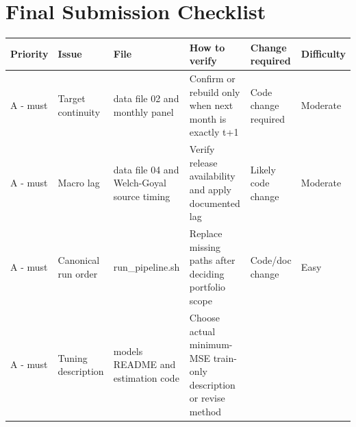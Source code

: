 \documentclass[
  11pt,
  a4paper]{article}
\newcounter{none} %
\begin{document}
\section{Final Submission Checklist}\label{app-checklist}

{\def\LTcaptype{none} %
\begin{landscape}
\scriptsize
\begin{longtable}[]{@{}
  >{\raggedright\arraybackslash}p{}
  >{\raggedright\arraybackslash}p{}
  >{\raggedright\arraybackslash}p{}
  >{\raggedright\arraybackslash}p{}
  >{\raggedright\arraybackslash}p{}
  >{\raggedright\arraybackslash}p{}@{}}
\toprule\noalign{}
\begin{minipage}[b]{\linewidth}\raggedright
Priority
\end{minipage} & \begin{minipage}[b]{\linewidth}\raggedright
Issue
\end{minipage} & \begin{minipage}[b]{\linewidth}\raggedright
File
\end{minipage} & \begin{minipage}[b]{\linewidth}\raggedright
How to verify
\end{minipage} & \begin{minipage}[b]{\linewidth}\raggedright
Change required
\end{minipage} & \begin{minipage}[b]{\linewidth}\raggedright
Difficulty
\end{minipage} \\
\midrule\noalign{}
\endhead
\bottomrule\noalign{}
\endlastfoot
A - must & Target continuity & data file 02 and monthly panel & Confirm
or rebuild only when next month is exactly t+1 & Code change required &
Moderate \\
A - must & Macro lag & data file 04 and Welch-Goyal source timing &
Verify release availability and apply documented lag & Likely code
change & Moderate \\
A - must & Canonical run order & run\_\allowbreak{}pipeline.sh & Replace missing
paths after deciding portfolio scope & Code/doc change & Easy \\
A - must & Tuning description & models README and estimation code &
Choose actual minimum-MSE train-only description or revise method &

\end{longtable}
\end{landscape}}
\end{document}
